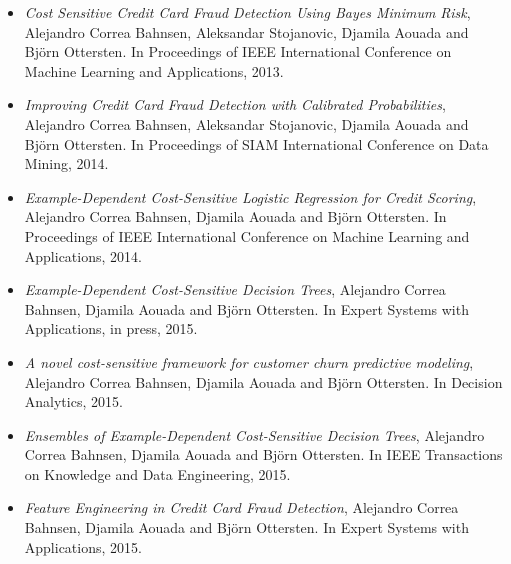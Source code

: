 \begin{itemize}
\item \citep{CorreaBahnsen2013} \textit{Cost Sensitive Credit Card Fraud Detection Using Bayes 
Minimum Risk}, Alejandro Correa Bahnsen,  Aleksandar Stojanovic, Djamila Aouada and Bj\"orn 
Ottersten. In Proceedings of IEEE International Conference on Machine Learning and Applications, 
2013.

\item \citep{CorreaBahnsen2014} \textit{Improving Credit Card Fraud Detection with Calibrated 
Probabilities}, Alejandro Correa Bahnsen, Aleksandar Stojanovic, Djamila Aouada and Bj\"orn 
Ottersten. In Proceedings of SIAM International Conference on Data Mining, 2014.

\item \citep{CorreaBahnsen2014b} \textit{Example-Dependent Cost-Sensitive Logistic Regression for 
Credit Scoring}, Alejandro Correa Bahnsen, Djamila Aouada and Bj\"orn Ottersten.
In Proceedings of IEEE International Conference on Machine Learning and Applications, 2014.

\item \citep{CorreaBahnsen2015} \textit{Example-Dependent Cost-Sensitive Decision Trees},
Alejandro Correa Bahnsen, Djamila Aouada and Bj\"orn Ottersten.
In Expert Systems with Applications, in press, 2015.

\item \citep{CorreaBahnsen2015a} \textit{A novel cost-sensitive framework for customer churn 
predictive modeling}, Alejandro Correa Bahnsen, Djamila Aouada and Bj\"orn Ottersten.
In Decision Analytics, 2015.

\item \citep{CorreaBahnsen2015b} \textit{Ensembles of Example-Dependent Cost-Sensitive Decision 
Trees}, Alejandro Correa Bahnsen, Djamila Aouada and Bj\"orn Ottersten.
In IEEE Transactions on Knowledge and Data Engineering, 2015.

\item \citep{CorreaBahnsen2015c} \textit{Feature Engineering in Credit Card Fraud Detection},
Alejandro Correa Bahnsen, Djamila Aouada and Bj\"orn Ottersten. In Expert Systems with 
Applications, 2015.

\end{itemize}

